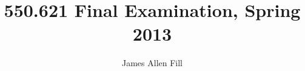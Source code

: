 
\addtolength{\textheight}{+1in}
\setlength{\textwidth}{5.75in}
\setlength{\oddsidemargin}{0.5in}
\addtolength{\topmargin}{-\topmargin}

\nofiles

\pagestyle{myheadings}

\title{550.621 Final Examination, Spring 2013}
\author{James Allen Fill}
\date{}


\newtheorem{theorem}{Theorem}[section]
\newtheorem{corollary}[theorem]{Corollary}
\newtheorem{lemma}[theorem]{Lemma}
\newtheorem{proposition}[theorem]{Proposition}
\newtheorem{example}[theorem]{\sl Example}
\newtheorem{remark}[theorem]{\sl Remark}
\newtheorem{definition}[theorem]{\sl Definition}
\newcommand{\qed}{\ \ \rule{1ex}{1ex}}
\newcommand{\lc}{\left\lceil}
\newcommand{\lf}{\left\lfloor}
\newcommand{\rc}{\right\rceil}
\newcommand{\rf}{\right\rfloor}
\newcommand{\proof}{\par\noindent  {\bf  Proof.  }}
\newcommand{\bd}[1]{{\bf  #1}}
\newcommand{\RR}{{\bf  R}}
\newcommand{\NN}{{\bf  N}}
\newcommand{\ZZ}{{\bf  Z}}
\newcommand{\CC}{{\bf  C}}
\newcommand{\QQ}{{\bf  Q}}
\newcommand{\SS}{{\bf  S}}
\newcommand{\xx}{{\bf  x}}
\newcommand{\yy}{{\bf  y}}
\newcommand{\zz}{{\bf  z}}
\newcommand{\ww}{{\bf  w}}
\newcommand{\Sj}{{{\cal S}_j}}
\newcommand{\Pt}{{\tilde{P}}}
\newcommand{\Var}{{\rm Var}}
\newcommand{\diag}{{\rm diag}}
\newcommand{\Exp}{{\rm Exp}}
\newcommand{\ave}{{\rm E}}
\newcommand{\Xt}{{\tilde{X}}}
\newcommand{\SSS}{{S}} %
\newcommand{\gxy}{g_{xy}}
\newcommand{\Gamxy}{{\Gamma(x, y)}}
\newcommand{\vece}{{\vec{e}}}
\newcommand{\vecep}{{\vece\,'}}
\newcommand{\Qe}{{Q(\vece\,)}}
\newcommand{\Qep}{{Q(\vecep)}}
\newcommand{\we}{{w(\vece\,)}}
\newcommand{\wep}{{w(\vecep)}}
\newcommand{\Kwe}{{K_w(\vece\,)}}
\newcommand{\phie}{{\phi(\vece\,)}}
\newcommand{\psie}{{\psi(\vece\,)}}
\newcommand{\be}{{b(\vece\,)}}
\newcommand{\vecE}{{\vec{E}}}
\newcommand{\GamxyQ}{{|\Gamma(x, y)|_Q}}
\newcommand{\Gamxyw}{{|\Gamma(x, y)|_w}}
\newcommand{\gamstar}{{\gamma_*}}
\newcommand{\gamstart}{{\gamma^t_*}}
\newcommand{\gamstarone}{{\gamma^1_*}}
\newcommand{\gamstartwo}{{\gamma^2_*}}
